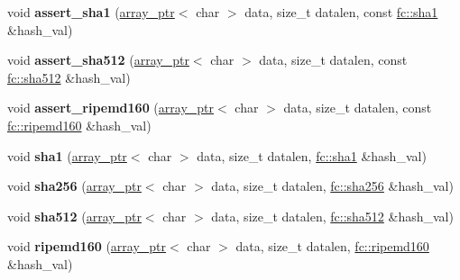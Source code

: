 \begin{DoxyCompactItemize}
\item 
\mbox{\label{classaacio_1_1chain_1_1crypto__api_ae431136940b917c587aa9c6096c49792}} 
void {\bfseries assert\+\_\+sha1} (\mbox{\hyperlink{structaacio_1_1chain_1_1array__ptr}{array\+\_\+ptr}}$<$ char $>$ data, size\+\_\+t datalen, const \mbox{\hyperlink{classfc_1_1sha1}{fc\+::sha1}} \&hash\+\_\+val)
\item 
\mbox{\label{classaacio_1_1chain_1_1crypto__api_a371594a494195cfdf9cc8c64fd7fa471}} 
void {\bfseries assert\+\_\+sha512} (\mbox{\hyperlink{structaacio_1_1chain_1_1array__ptr}{array\+\_\+ptr}}$<$ char $>$ data, size\+\_\+t datalen, const \mbox{\hyperlink{classfc_1_1sha512}{fc\+::sha512}} \&hash\+\_\+val)
\item 
\mbox{\label{classaacio_1_1chain_1_1crypto__api_a924a34c8c5319eff9fd335d4fea1cd93}} 
void {\bfseries assert\+\_\+ripemd160} (\mbox{\hyperlink{structaacio_1_1chain_1_1array__ptr}{array\+\_\+ptr}}$<$ char $>$ data, size\+\_\+t datalen, const \mbox{\hyperlink{classfc_1_1ripemd160}{fc\+::ripemd160}} \&hash\+\_\+val)
\item 
\mbox{\label{classaacio_1_1chain_1_1crypto__api_a4d542dd0470849da1b3fbbfbc33c0f4a}} 
void {\bfseries sha1} (\mbox{\hyperlink{structaacio_1_1chain_1_1array__ptr}{array\+\_\+ptr}}$<$ char $>$ data, size\+\_\+t datalen, \mbox{\hyperlink{classfc_1_1sha1}{fc\+::sha1}} \&hash\+\_\+val)
\item 
\mbox{\label{classaacio_1_1chain_1_1crypto__api_a0e7e6bd0eee127a77f8e09ad236f4c76}} 
void {\bfseries sha256} (\mbox{\hyperlink{structaacio_1_1chain_1_1array__ptr}{array\+\_\+ptr}}$<$ char $>$ data, size\+\_\+t datalen, \mbox{\hyperlink{classfc_1_1sha256}{fc\+::sha256}} \&hash\+\_\+val)
\item 
\mbox{\label{classaacio_1_1chain_1_1crypto__api_aea31993214588154554409336e9afec7}} 
void {\bfseries sha512} (\mbox{\hyperlink{structaacio_1_1chain_1_1array__ptr}{array\+\_\+ptr}}$<$ char $>$ data, size\+\_\+t datalen, \mbox{\hyperlink{classfc_1_1sha512}{fc\+::sha512}} \&hash\+\_\+val)
\item 
\mbox{\label{classaacio_1_1chain_1_1crypto__api_a66201bf71d054e03d0dad53beceade85}} 
void {\bfseries ripemd160} (\mbox{\hyperlink{structaacio_1_1chain_1_1array__ptr}{array\+\_\+ptr}}$<$ char $>$ data, size\+\_\+t datalen, \mbox{\hyperlink{classfc_1_1ripemd160}{fc\+::ripemd160}} \&hash\+\_\+val)
\end{DoxyCompactItemize}
